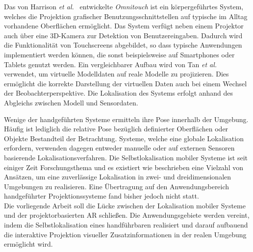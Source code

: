 Das von Harrison \textit{et al.\ }\cite{Harrison2011} entwickelte \textit{Omnitouch} ist ein körpergeführtes System, welches die Projektion grafischer Benutzungsschnittstellen auf typische im Alltag vorhandene Oberflächen ermöglicht. Das System verfügt neben einem Projektor auch über eine 3D-Kamera zur Detektion von Benutzereingaben. Dadurch wird die Funktionalität von Touchscreens abgebildet, so dass typische Anwendungen implementiert werden können, die sonst beispielsweise auf Smartphones oder Tablets genutzt werden. Ein vergleichbarer Aufbau wird von Tan \textit{et al.} \cite{Tan2013} verwendet, um virtuelle Modelldaten auf reale Modelle zu projizieren. Dies ermöglicht die korrekte Darstellung der virtuellen Daten auch bei einem Wechsel der Beobachterperspektive. Die Lokalisation des Systems erfolgt anhand des Abgleichs zwischen Modell und Sensordaten.\\

\prever{
}

Wenige der handgeführten Systeme ermitteln ihre Pose innerhalb der Umgebung. Häufig ist lediglich die relative Pose bezüglich definierter Oberflächen oder Objekte Bestandteil der Betrachtung. Systeme, welche eine globale Lokalisation erfordern, verwenden dagegen entweder manuelle oder auf externen Sensoren basierende Lokalisationsverfahren. Die Selbstlokalisation mobiler Systeme ist seit einiger Zeit Forschungsthema und es existiert wie beschrieben eine Vielzahl von Ansätzen, um eine zuverlässige Lokalisation in zwei- und dreidimensionalen Umgebungen zu realisieren. Eine Übertragung auf den Anwendungsbereich handgeführter Projektionssysteme fand bisher jedoch nicht statt.\\

Die vorliegende Arbeit soll die Lücke zwischen der Lokalisation mobiler Systeme und der projektorbasierten AR schließen. Die Anwendungsgebiete werden vereint, indem die Selbstlokalisation eines handführbaren  realisiert und darauf aufbauend die interaktive Projektion visueller Zusatzinformationen in der realen Umgebung ermöglicht wird.\\

\prever{
}


